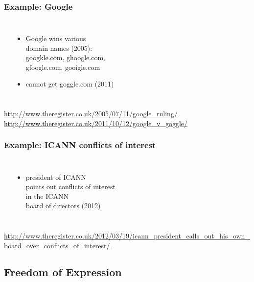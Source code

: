 \documentclass[dvipsnames]{beamer}
\theoremstyle{plain}
\begin{document}
\begin{frame}
  \frametitle{Example: Google}

  \begin{columns}
    \begin{center}
    \end{center}

    \begin{itemize}
      \item Google wins various\\
        domain names (2005):\\
        googkle.com, ghoogle.com,\\
        gfoogle.com, gooigle.com
      \item cannot get goggle.com (2011)
    \end{itemize}
  \end{columns}

  \medskip
  \tiny{\url{http://www.theregister.co.uk/2005/07/11/google_ruling/}}\\
  \tiny{\url{http://www.theregister.co.uk/2011/10/12/google_v_goggle/}}\\
\end{frame}

\begin{frame}
  \frametitle{Example: ICANN conflicts of interest}

  \begin{columns}
    \begin{center}
    \end{center}

    \begin{itemize}
      \item president of ICANN\\
        points out conflicts of interest\\
        in the ICANN\\
        board of directors (2012)
    \end{itemize}
  \end{columns}

  \medskip
  \tiny{\url{http://www.theregister.co.uk/2012/03/19/icann_president_calls_out_his_own_board_over_conflicts_of_interest/}}\\
\end{frame}

\subsection{Freedom of Expression}
\end{document}
